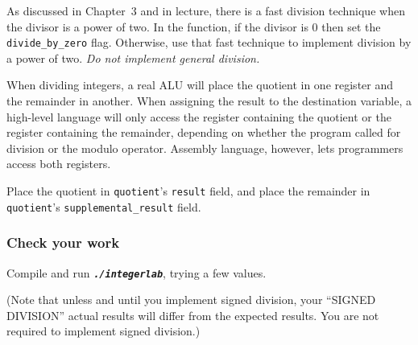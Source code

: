 As discussed in Chapter~3 and in lecture, there is a fast division technique when the divisor is a power of two.
In the  function, if the divisor is 0 then set the \lstinline{divide_by_zero} flag.
Otherwise, use that fast technique to implement division by a power of two.
\textit{Do not implement general division.}

When dividing integers, a real ALU will place the quotient in one register and the remainder in another.
When assigning the result to the destination variable, a high-level language will only access the register containing the quotient or the register containing the remainder, depending on whether the program called for division or the modulo operator.
Assembly language, however, lets programmers access both registers.

Place the quotient in \lstinline{quotient}'s \lstinline{result} field, and place the remainder in \lstinline{quotient}'s \lstinline{supplemental_result} field.


\subsubsection*{Check your work}

Compile and run \texttt{\textbf{\textit{./integerlab}}}, trying a few values.

(Note that unless and until you implement signed division, your ``SIGNED DIVISION'' actual results will differ from the expected results.
You are not required to implement signed division.)

